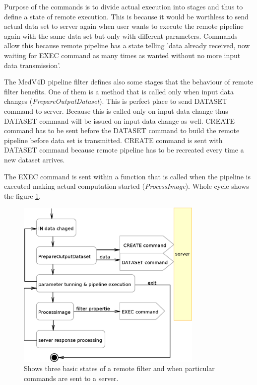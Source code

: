\par
Purpose of the commands is to divide actual execution into stages and thus to define a state of remote execution.
This is because it would be worthless to send actual data set to server again when user wants to execute the remote pipeline again with the same data set but only with different parameters.
Commands allow this because remote pipeline has a state telling 'data already received, now waiting for EXEC command as many times as wanted without no more input data transmission'.

\par
The MedV4D pipeline filter defines also some stages that the behaviour of remote filter benefits.
One of them is a method that is called only when input data changes (\mbox{\emph{PrepareOutputDataset}}).
This is perfect place to send DATASET command to server.
Because this is called only on input data change thus DATASET command will be issued on input data change as well.
CREATE command has to be sent before the DATASET command to build the remote pipeline before data set is transmitted.
CREATE command is sent with DATASET command because remote pipeline has to be recreated every time a new dataset arrives.

\par
The EXEC command is sent within a function that is called when the pipeline is executed making actual computation started (\mbox{\emph{ProcessImage}}).
Whole cycle shows the figure \ref{fg:RCClientCycle}.

\begin{figure}
    \centering
    \includegraphics[width=0.8\textwidth]{data/RCClientCycle}
    \caption[Remote MedV4D filter]{Shows three basic states of a remote filter and when particular commands are sent to a server.}
    \label{fg:RCClientCycle}
\end{figure}


